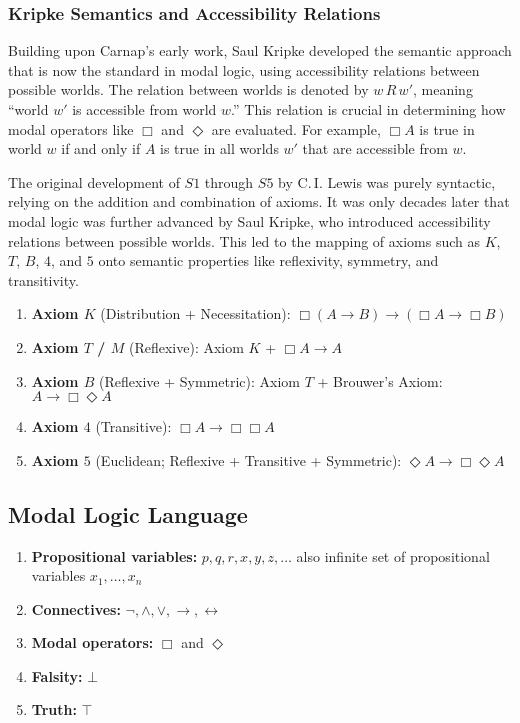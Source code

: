 \documentclass[12pt,a4paper,openany]{article}
\begin{document}
\subsubsection{Kripke Semantics and Accessibility Relations}

Building upon Carnap's early work, Saul Kripke developed the semantic approach that is now the standard in modal logic, using accessibility relations between possible worlds. The relation between worlds is denoted by $w \, R \, w'$, meaning ``world $w'$ is accessible from world $w$.'' This relation is crucial in determining how modal operators like $\Box$ and $\Diamond$ are evaluated. For example, $\Box A$ is true in world $w$ if and only if $A$ is true in all worlds $w'$ that are accessible from $w$.

The original development of $S1$ through $S5$ by C.\,I. Lewis was purely syntactic, relying on the addition and combination of axioms. It was only decades later that modal logic was further advanced by Saul Kripke, who introduced accessibility relations between possible worlds. This led to the mapping of axioms such as $K$, $T$, $B$, $4$, and $5$ onto semantic properties like reflexivity, symmetry, and transitivity.

\begin{enumerate}
    \item \textbf{Axiom $K$} (Distribution + Necessitation): $\Box (A \to B) \to (\Box A \to \Box B)$
    \item \textbf{Axiom $T$ / $M$} (Reflexive): Axiom $K$ + $\Box A \to A$
    \item \textbf{Axiom $B$} (Reflexive + Symmetric): Axiom $T$ + Brouwer's Axiom: $A \to \Box \Diamond A$
    \item \textbf{Axiom $4$} (Transitive): $\Box A \to \Box \Box A$
    \item \textbf{Axiom $5$} (Euclidean; Reflexive + Transitive + Symmetric): $\Diamond A \to \Box \Diamond A$
\end{enumerate}

\subsection{Modal Logic Language}

\begin{enumerate}
    \item \textbf{Propositional variables:} $p, q, r, x, y, z, \dots$ also infinite set of propositional variables $x_1, \dots, x_n$
    \item \textbf{Connectives:} $\neg, \land, \lor, \to, \leftrightarrow$
    \item \textbf{Modal operators:} $\Box$ and $\Diamond$
    \item \textbf{Falsity:} $\bot$
    \item \textbf{Truth:} $\top$
\end{enumerate}
\end{document}
